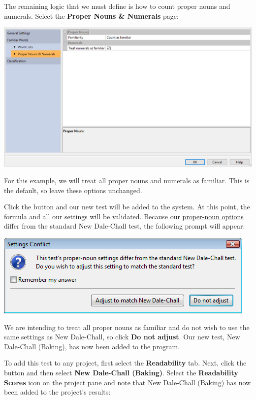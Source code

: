 \documentclass[
]{book}
\theoremstyle{definition}
\theoremstyle{definition}
\theoremstyle{definition}
\theoremstyle{definition}
\theoremstyle{remark}
\begin{document}
The remaining logic that we must define is how to count proper nouns and numerals. Select the \textbf{Proper Nouns \& Numerals} page:

\includegraphics{Images/CustomTestTreat.png}

For this example, we will treat all proper nouns and numerals as familiar. This is the default, so leave these options unchanged.

Click the  button and our new test will be added to the system. At this point, the formula and all our settings will be validated. Because our \protect\hyperlink{readability-test-options}{proper-noun options} differ from the standard New Dale-Chall test, the following prompt will appear:

\begin{center}\includegraphics[width=0.5\linewidth,]{Images/NonGenerated/CustomTestDCProperNounWarning} \end{center}

We are intending to treat all proper nouns as familiar and do not wish to use the same settings as New Dale-Chall, so click \textbf{Do not adjust}. Our new test, New Dale-Chall (Baking), has now been added to the program.

To add this test to any project, first select the \textbf{Readability} tab. Next, click the  button and then select \textbf{New Dale-Chall (Baking)}. Select the \textbf{Readability Scores} icon on the project pane and note that New Dale-Chall (Baking) has now been added to the project's results:
\end{document}
